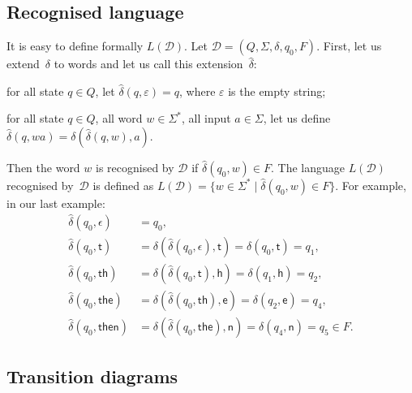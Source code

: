 \subsection*{Recognised language}

It is easy to define formally \(L(\mathcal{D})\). Let \(\mathcal{D} =
(Q, \Sigma, \delta, q_0, F)\). First, let us extend~\(\delta\) to
words and let us call this extension~\(\hat{\delta}\):
\begin{itemize*}

  \item for all state \(q \in Q\), let \(\hat{\delta} (q, \varepsilon)
    = q\), where \(\varepsilon\) is the empty string;

  \item for all state \(q \in Q\), all word \(w \in \Sigma^{*}\), all
    input \(a \in \Sigma\), let us define \(\hat{\delta} (q, wa) =
    \delta (\hat{\delta}(q,w),a)\).

\end{itemize*}
Then the word \(w\) is recognised by \(\mathcal{D}\) if
\(\hat{\delta}(q_0, w) \in F\). The language \(L(\mathcal{D})\)
recognised by~\(\mathcal{D}\) is defined as \(L(\mathcal{D}) = \{w \in
\Sigma^{*} \; \lvert \; \hat{\delta}(q_0, w) \in F\}\). For example,
in our last example:
\begin{equation*}
\begin{aligned}
   \hat{\delta}(q_0, \epsilon)
&= q_0,\\
   \hat{\delta}(q_0, \textsf{t})
&= \delta (\hat{\delta}(q_0, \epsilon), \textsf{t})
= \delta (q_0, \textsf{t})
= q_1,\\
   \hat{\delta}(q_0, \textsf{th})
&= \delta (\hat{\delta}(q_0, \textsf{t}), \textsf{h})
= \delta (q_1, \textsf{h})
= q_2,\\
   \hat{\delta}(q_0, \textsf{the})
&= \delta (\hat{\delta}(q_0, \textsf{th}), \textsf{e})
= \delta (q_2, \textsf{e})
= q_4,\\
   \hat{\delta}(q_0, \textsf{then}) 
&= \delta (\hat{\delta}(q_0, \textsf{the}), \textsf{n})
= \delta (q_4, \textsf{n})
= q_5 \in F.
\end{aligned}
\end{equation*}

\subsection*{Transition diagrams}
 
